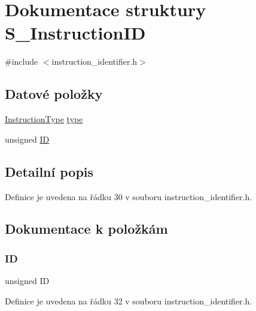 \hypertarget{struct_s___instruction_i_d}{}\section{Dokumentace struktury S\+\_\+\+Instruction\+ID}
\label{struct_s___instruction_i_d}


{\ttfamily \#include $<$instruction\+\_\+identifier.\+h$>$}

\subsection*{Datové položky}
\begin{DoxyCompactItemize}
\item 
\hyperlink{instruction__identifier_8h_a0fd169cab2a2c0d1bcd094d69ccc98e7}{Instruction\+Type} \hyperlink{struct_s___instruction_i_d_a6cfbeb01a949b4fcaa6d6c8265b174be}{type}
\item 
unsigned \hyperlink{struct_s___instruction_i_d_ac6aae43c72cdc2c322ef01d6621a805b}{ID}
\end{DoxyCompactItemize}


\subsection{Detailní popis}


Definice je uvedena na řádku 30 v souboru instruction\+\_\+identifier.\+h.



\subsection{Dokumentace k položkám}
\mbox{\label{struct_s___instruction_i_d_ac6aae43c72cdc2c322ef01d6621a805b}} 
\subsubsection{\texorpdfstring{ID}{ID}}
{\footnotesize\ttfamily unsigned ID}



Definice je uvedena na řádku 32 v souboru instruction\+\_\+identifier.\+h.

\mbox{\label{struct_s___instruction_i_d_a6cfbeb01a949b4fcaa6d6c8265b174be}} 
